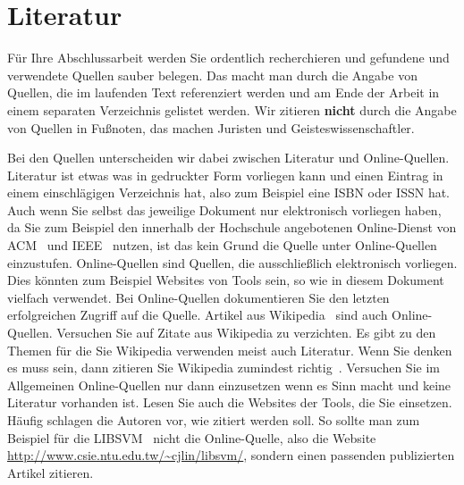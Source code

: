 \documentclass[11pt,a4paper]{report}
\begin{document}
\section{Literatur}

Für Ihre Abschlussarbeit werden Sie ordentlich recherchieren
und gefundene und verwendete Quellen sauber belegen. 
Das macht man durch die Angabe von Quellen, die im laufenden 
Text referenziert werden und am Ende der Arbeit in einem
separaten Verzeichnis gelistet werden. 
Wir zitieren \textbf{nicht} durch die Angabe von Quellen
in Fußnoten, das machen Juristen und Geisteswissenschaftler.

Bei den Quellen unterscheiden wir dabei zwischen Literatur und 
Online-Quellen.
Literatur ist etwas was in gedruckter Form vorliegen kann
und einen Eintrag in einem einschlägigen Verzeichnis hat,
also zum Beispiel eine ISBN oder ISSN hat.
Auch wenn Sie selbst das jeweilige Dokument nur elektronisch 
vorliegen haben, 
da Sie zum Beispiel den innerhalb der Hochschule angebotenen
Online-Dienst von ACM~\cite{acm} und IEEE~\cite{ieee} nutzen,
ist das kein Grund die Quelle unter Online-Quellen einzustufen.
Online-Quellen sind Quellen, die ausschließlich elektronisch
vorliegen. 
Dies könnten zum Beispiel Websites von Tools sein, so wie
in diesem Dokument vielfach verwendet. 
Bei Online-Quellen dokumentieren Sie den letzten erfolgreichen
Zugriff auf die Quelle.
Artikel aus Wikipedia~\cite{wikipedia} sind auch Online-Quellen.
Versuchen Sie auf Zitate aus Wikipedia zu verzichten. 
Es gibt zu den Themen für die Sie Wikipedia verwenden meist 
auch Literatur.
Wenn Sie denken es muss sein, dann zitieren Sie Wikipedia 
zumindest richtig~\cite{wikiciting}.
Versuchen Sie im Allgemeinen Online-Quellen nur dann einzusetzen
wenn es Sinn macht und keine Literatur vorhanden ist. 
Lesen Sie auch die Websites der Tools, die Sie einsetzen. 
Häufig schlagen die Autoren vor, wie zitiert werden soll.
So sollte man zum Beispiel für die LIBSVM~\cite{libsvm}
nicht die Online-Quelle, also die Website
\url{http://www.csie.ntu.edu.tw/~cjlin/libsvm/}, 
sondern einen passenden publizierten Artikel zitieren.
\end{document}
